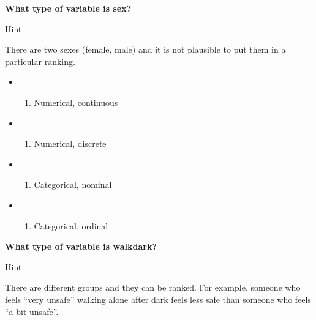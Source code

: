 \documentclass[
]{book}
\providecommand{\tightlist}{%
  \setlength{\itemsep}{0pt}\setlength{\parskip}{0pt}}
\begin{document}
\textbf{What type of variable is sex?}

Hint

There are two sexes (female, male) and it is not plausible to put them in a particular ranking.

\begin{itemize}
\item
  \begin{enumerate}
  \def\labelenumi{(\Alph{enumi})}
  \tightlist
  \item
    Numerical, continuous\\
  \end{enumerate}
\item
  \begin{enumerate}
  \def\labelenumi{(\Alph{enumi})}
  \setcounter{enumi}{1}
  \tightlist
  \item
    Numerical, discrete\\
  \end{enumerate}
\item
  \begin{enumerate}
  \def\labelenumi{(\Alph{enumi})}
  \setcounter{enumi}{2}
  \tightlist
  \item
    Categorical, nominal\\
  \end{enumerate}
\item
  \begin{enumerate}
  \def\labelenumi{(\Alph{enumi})}
  \setcounter{enumi}{3}
  \tightlist
  \item
    Categorical, ordinal
  \end{enumerate}
\end{itemize}

\textbf{What type of variable is walkdark?}

Hint

There are different groups and they can be ranked. For example, someone who feels ``very unsafe'' walking alone after dark feels less safe than someone who feels ``a bit unsafe''.
\end{document}
